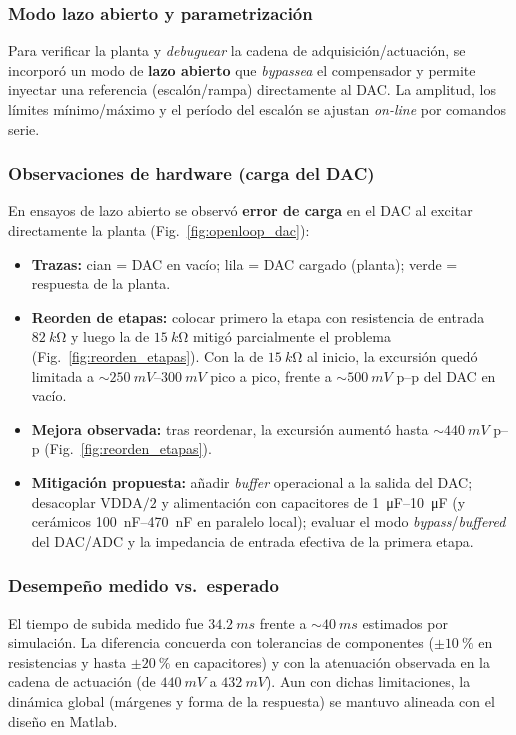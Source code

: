 \subsubsection{Modo lazo abierto y parametrización}
Para verificar la planta y \emph{debuguear} la cadena de adquisición/actuación, se incorporó un modo de \textbf{lazo abierto} que \emph{bypassea} el compensador y permite inyectar una referencia (escalón/rampa) directamente al DAC. La amplitud, los límites mínimo/máximo y el período del escalón se ajustan \emph{on-line} por comandos serie.

\subsubsection{Observaciones de hardware (carga del DAC)}
En ensayos de lazo abierto se observó \textbf{error de carga} en el DAC al excitar directamente la planta (Fig.~\ref{fig:openloop_dac}):
\begin{itemize}
	\item \textbf{Trazas:} cian = DAC en vacío; lila = DAC cargado (planta); verde = respuesta de la planta.
	\item \textbf{Reorden de etapas:} colocar primero la etapa con resistencia de entrada \(\SI{82}{k\ohm}\) y luego la de \(\SI{15}{k\ohm}\) mitigó parcialmente el problema (Fig.~\ref{fig:reorden_etapas}). Con la de \(\SI{15}{k\ohm}\) al inicio, la excursión quedó limitada a \(\sim\SI{250}{mV}\)–\(\SI{300}{mV}\) pico a pico, frente a \(\sim\SI{500}{mV}\) p–p del DAC en vacío.
	\item \textbf{Mejora observada:} tras reordenar, la excursión aumentó hasta \(\sim\SI{440}{mV}\) p–p (Fig.~\ref{fig:reorden_etapas}).
	\item \textbf{Mitigación propuesta:} añadir \emph{buffer} operacional a la salida del DAC; desacoplar \(\mathrm{VDDA}/2\) y alimentación con capacitores de \SIrange{1}{10}{\micro\farad} (y cerámicos \SIrange{100}{470}{nF} en paralelo local); evaluar el modo \emph{bypass}/\emph{buffered} del DAC/ADC y la impedancia de entrada efectiva de la primera etapa.
\end{itemize}


\subsubsection{Desempeño medido vs.\ esperado}
El tiempo de subida medido fue \(\SI{34.2}{ms}\) frente a \(\sim\SI{40}{ms}\) estimados por simulación. La diferencia concuerda con tolerancias de componentes (\(\pm\SI{10}{\percent}\) en resistencias y hasta \(\pm\SI{20}{\percent}\) en capacitores) y con la atenuación observada en la cadena de actuación (de \(\SI{440}{mV}\) a \(\SI{432}{mV}\)). Aun con dichas limitaciones, la dinámica global (márgenes y forma de la respuesta) se mantuvo alineada con el diseño en Matlab.

